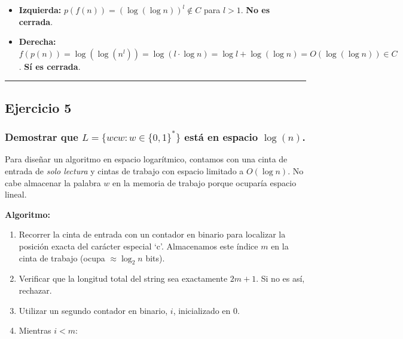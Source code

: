 \documentclass[12pt]{book} %
\providecommand{\tightlist}{%
  \setlength{\itemsep}{0pt}\setlength{\parskip}{0pt}}
\begin{document}
\begin{itemize}
\tightlist
\item
  \textbf{Izquierda:} \(p(f(n)) = (\log(\log n))^l \notin C\) para
  \(l > 1\). \textbf{No es cerrada}.
\item
  \textbf{Derecha:}
  \(f(p(n)) = \log(\log(n^l)) = \log(l \cdot \log n) = \log l + \log(\log n) = O(\log(\log n)) \in C\).
  \textbf{Sí es cerrada}.
\end{itemize}

\begin{center}\rule{0.5\linewidth}{0.5pt}\end{center}

\hypertarget{ejercicio-5}{%
\subsection{Ejercicio 5}\label{ejercicio-5}}

\hypertarget{demostrar-que-lwcwwin01-estuxe1-en-espacio-logn.}{%
\subsubsection{\texorpdfstring{Demostrar que
\(L=\{wcw:w\in\{0,1\}^{*}\}\) está en espacio
\(\log(n)\).}{Demostrar que L=\textbackslash\{wcw:w\textbackslash in\textbackslash\{0,1\textbackslash\}\^{}\{*\}\textbackslash\} está en espacio \textbackslash log(n).}}\label{demostrar-que-lwcwwin01-estuxe1-en-espacio-logn.}}

Para diseñar un algoritmo en espacio logarítmico, contamos con una cinta
de entrada de \emph{solo lectura} y cintas de trabajo con espacio
limitado a \(O(\log n)\). No cabe almacenar la palabra \(w\) en la
memoria de trabajo porque ocuparía espacio lineal.

\textbf{Algoritmo:}

\begin{enumerate}
\def\labelenumi{\arabic{enumi}.}
\tightlist
\item
  Recorrer la cinta de entrada con un contador en binario para localizar
  la posición exacta del carácter especial `c'. Almacenamos este índice
  \(m\) en la cinta de trabajo (ocupa \(\approx \log_2 n\) bits).
\item
  Verificar que la longitud total del string sea exactamente \(2m + 1\).
  Si no es así, rechazar.
\item
  Utilizar un segundo contador en binario, \(i\), inicializado en \(0\).
\item
  Mientras \(i < m\):
\end{enumerate}
\end{document}
